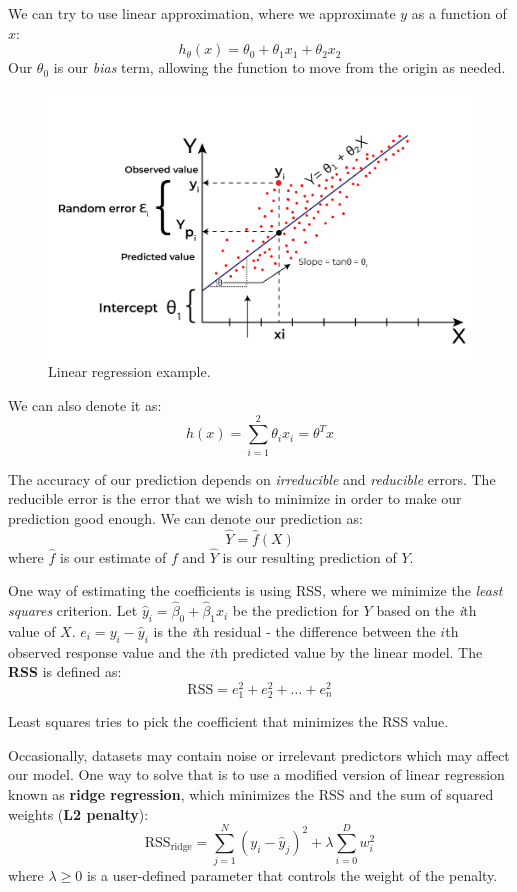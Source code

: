 \documentclass{book}
\begin{document}
We can try to use linear approximation, where we approximate $y$ as a function of $x$:
\[
h_{\theta}(x) = \theta_0 + \theta_1 x_1 + \theta_2 x_2
\]
Our $\theta_0$ is our \textit{bias} term, allowing the function to move from the origin as needed.

\begin{figure}[ht]
    \centering
    \includegraphics[width=\linewidth]{../assets/linear-reg.png}
    \caption{Linear regression example.}
\end{figure}

We can also denote it as:
\[
h(x) = \sum_{i=1}^2 \theta_i x_i = \theta^T x
\]

The accuracy of our prediction depends on \textit{irreducible} and \textit{reducible} errors. The reducible error is the error that we wish to minimize in order to make our prediction good enough. We can denote our prediction as:
\[
\hat{Y} = \hat{f}(X)
\]
where $\hat{f}$ is our estimate of $f$ and $\hat{Y}$ is our resulting prediction of $Y$.

One way of estimating the coefficients is using RSS, where we minimize the \textit{least squares} criterion. Let $\hat{y}_i = \hat{\beta}_0 + \hat{\beta}_1x_i$ be the prediction for $Y$ based on the \textit{i}th value of $X$. $e_i = y_i - \hat{y}_i$ is the \textit{i}th residual - the difference between the $\textit{i}$th observed response value and the $\textit{i}$th predicted value by the linear model. The \textbf{RSS} is defined as:
\[
\text{RSS} = e_1^2 + e_2^2 + \dots + e_n^2
\]

Least squares tries to pick the coefficient that minimizes the RSS value.

Occasionally, datasets may contain noise or irrelevant predictors which may affect our model. One way to solve that is to use a modified version of linear regression known as \textbf{ridge regression}, which minimizes the RSS and the sum of squared weights (\textbf{L2 penalty}):
\[
\text{RSS}_{\text{ridge}} = \sum_{j=1}^N (y_i - \hat{y}_j)^2 + \lambda \sum_{i=0}^D w_i^2
\]
where $\lambda \geq 0$ is a user-defined parameter that controls the weight of the penalty.
\end{document}

